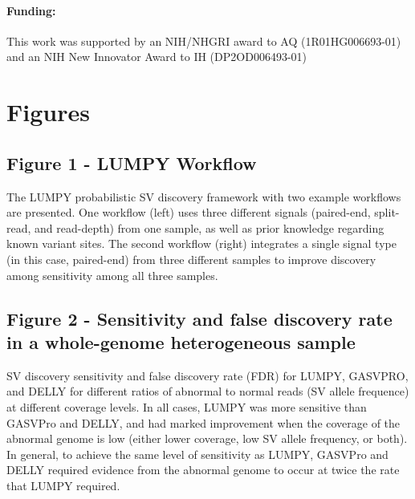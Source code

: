 \documentclass[10pt]{bmc_article}
\def\texttt{[image: ]}
\newenvironment{bmcformat}{\begin{raggedright}\baselineskip20pt\sloppy\setboolean{publ}{false}}{\end{raggedright}\baselineskip20pt\sloppy}
\begin{document}
\begin{bmcformat}
\paragraph{Funding:} This work was supported by an NIH/NHGRI award to
AQ (1R01HG006693-01) and an NIH New Innovator Award to IH (DP2OD006493-01)

%
%

{
   }



\section*{Figures}
\subsection*{Figure 1 - LUMPY Workflow}
The LUMPY probabilistic SV discovery framework with two example
workflows are presented. One workflow (left) uses three different signals
(paired-end, split-read, and read-depth) from one sample, as well as prior
knowledge regarding known variant sites. The second workflow (right) integrates
a single signal type (in this case, paired-end) from three different samples to
improve discovery among sensitivity among all three samples.

\subsection*{Figure 2 - Sensitivity and false discovery rate in a whole-genome
heterogeneous sample}
SV discovery sensitivity and false discovery rate (FDR) for LUMPY, GASVPRO, and
DELLY for different ratios of abnormal to normal reads (SV allele frequence) at
different coverage levels.  In all cases, LUMPY was more sensitive than GASVPro
and DELLY, and had marked improvement when the coverage of the abnormal
genome is low (either lower coverage, low SV allele frequency, or both).  In
general, to achieve the same level of sensitivity as LUMPY, GASVPro and DELLY
required evidence from the abnormal genome to occur at twice the rate that LUMPY
required. 



\end{bmcformat}
\end{document}
